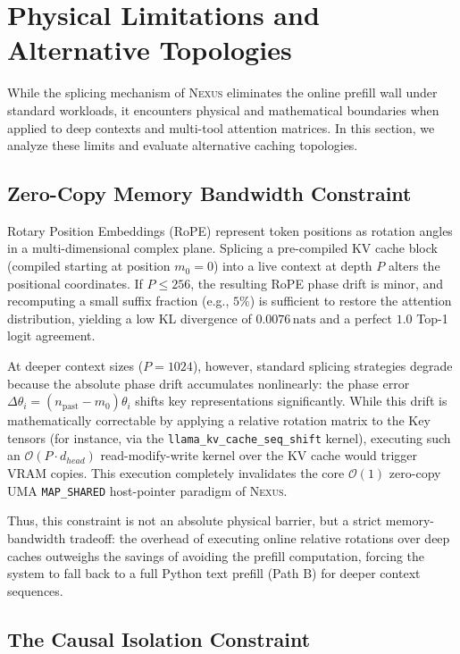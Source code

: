 \section{Physical Limitations and Alternative Topologies}
\label{sec:limitations}

While the splicing mechanism of \textsc{Nexus} eliminates the online prefill wall under standard workloads, it encounters physical and mathematical boundaries when applied to deep contexts and multi-tool attention matrices. In this section, we analyze these limits and evaluate alternative caching topologies.

\subsection{Zero-Copy Memory Bandwidth Constraint}
\label{sec:zero-copy-bandwidth}

Rotary Position Embeddings (RoPE) represent token positions as rotation angles in a multi-dimensional complex plane. Splicing a pre-compiled KV cache block (compiled starting at position $m_0=0$) into a live context at depth $P$ alters the positional coordinates. If $P \le 256$, the resulting RoPE phase drift is minor, and recomputing a small suffix fraction (e.g., $5\%$) is sufficient to restore the attention distribution, yielding a low KL divergence of $0.0076\,\text{nats}$ and a perfect $1.0$ Top-1 logit agreement.

At deeper context sizes ($P = 1024$), however, standard splicing strategies degrade because the absolute phase drift accumulates nonlinearly: the phase error $\Delta \theta_i = (n_{\text{past}} - m_0)\theta_i$ shifts key representations significantly. While this drift is mathematically correctable by applying a relative rotation matrix to the Key tensors (for instance, via the \texttt{llama\_kv\_cache\_seq\_shift} kernel), executing such an $\mathcal{O}(P \cdot d_{head})$ read-modify-write kernel over the KV cache would trigger VRAM copies. This execution completely invalidates the core $\mathcal{O}(1)$ zero-copy UMA \texttt{MAP\_SHARED} host-pointer paradigm of \textsc{Nexus}. 

Thus, this constraint is not an absolute physical barrier, but a strict memory-bandwidth tradeoff: the overhead of executing online relative rotations over deep caches outweighs the savings of avoiding the prefill computation, forcing the system to fall back to a full Python text prefill (Path B) for deeper context sequences.

\subsection{The Causal Isolation Constraint}
\label{sec:causal-isolation}

